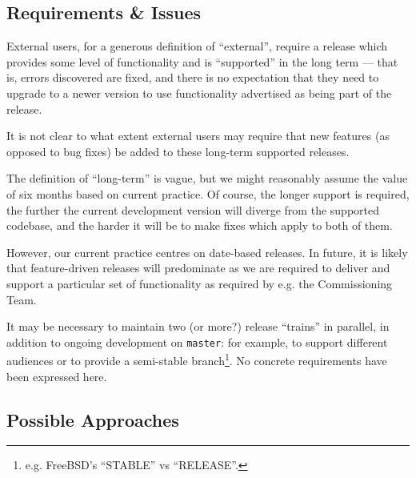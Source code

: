 \documentclass[DM,toc]{lsstdoc}
\begin{document}
\subsection{Requirements \& Issues}

External users, for a generous definition of ``external'', require a release
which provides some level of functionality and is ``supported'' in the long
term --- that is, errors discovered are fixed, and there is no expectation
that they need to upgrade to a newer version to use functionality advertised
as being part of the release.

It is not clear to what extent external users may require that new features
(as opposed to bug fixes) be added to these long-term supported releases.

The definition of ``long-term'' is vague, but we might reasonably assume the
value of six months based on current practice. Of course, the longer support
is required, the further the current development version will diverge from the
supported codebase, and the harder it will be to make fixes which apply to
both of them.

However, our current practice centres on date-based releases. In future, it
is likely that feature-driven releases will predominate as we are required to
deliver and support a particular set of functionality as required by e.g. the
Commissioning Team.

It may be necessary to maintain two (or more?) release ``trains'' in parallel,
in addition to ongoing development on \texttt{master}: for example, to support
different audiences or to provide a semi-stable branch\footnote{e.g. FreeBSD's
``STABLE'' vs ``RELEASE''.}. No concrete requirements have been expressed
here.

\subsection{Possible Approaches}
\end{document}
